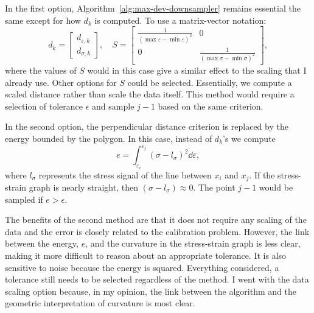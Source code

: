 \documentclass[a4paper,11pt]{article}
\begin{document}
In the first option, Algorithm~\ref{alg:max-dev-downsampler} remains essential the same except for how $d_k$ is computed.
To use a matrix-vector notation:
\begin{equation*}
    d_k = \begin{bmatrix}
        d_{\varepsilon,k} \\
        d_{\sigma,k}
    \end{bmatrix}, \quad
    S = \begin{bmatrix}
        \frac{1}{(\max \varepsilon - \min \varepsilon)^2} & 0 \\
        0 & \frac{1}{(\max \sigma - \min \sigma)^2}
    \end{bmatrix},
\end{equation*}
where the values of $S$ would in this case give a similar effect to the scaling that I already use.
Other options for $S$ could be selected.
Essentially, we compute a scaled distance rather than scale the data itself.
This method would require a selection of tolerance $\epsilon$ and sample $j-1$ based on the same criterion.

In the second option, the perpendicular distance criterion is replaced by the energy bounded by the polygon.
In this case, instead of $d_k$'s we compute
\begin{equation*}
    e = \int_{\varepsilon_i}^{\varepsilon_j} (\sigma - l_\sigma)^2 \dd \varepsilon,
\end{equation*}
where $l_\sigma$ represents the stress signal of the line between $x_i$ and $x_j$.
If the stress-strain graph is nearly straight, then $(\sigma - l_\sigma) \approx 0$.
The point $j-1$ would be sampled if $e > \epsilon$.

The benefits of the second method are that it does not require any scaling of the data and the error is closely related to the calibration problem.
However, the link between the energy, $e$, and the curvature in the stress-strain graph is less clear, making it more difficult to reason about an appropriate tolerance.
It is also sensitive to noise because the energy is squared.
Everything considered, a tolerance still needs to be selected regardless of the method.
I went with the data scaling option because, in my opinion, the link between the algorithm and the geometric interpretation of curvature is most clear.






\end{document}
